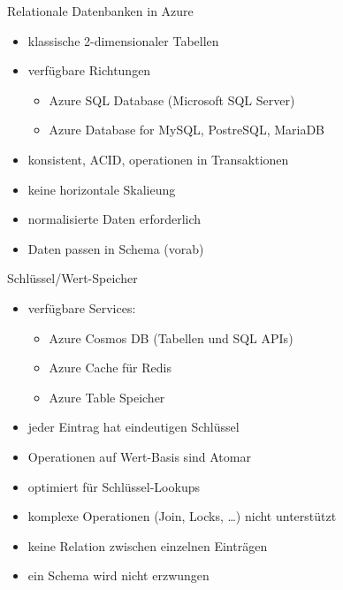 \begin{flashcard}[Definition]{Relationale Datenbanken in Azure}
  \begin{itemize}
    \item klassische 2-dimensionaler Tabellen
    \item verfügbare Richtungen
      \begin{itemize}
        \item Azure SQL Database (Microsoft SQL Server)
        \item Azure Database for MySQL, PostreSQL, MariaDB
      \end{itemize}
    \item konsistent, ACID, operationen in Transaktionen
    \item keine horizontale Skalieung
    \item normalisierte Daten erforderlich
    \item Daten passen in Schema (vorab)
  \end{itemize}
\end{flashcard}

\begin{flashcard}[Definition]{Schlüssel/Wert-Speicher}
  \begin{itemize}
    \item verfügbare Services:
      \begin{itemize}
        \item Azure Cosmos DB (Tabellen und SQL APIs)
        \item Azure Cache für Redis
        \item Azure Table Speicher
      \end{itemize}
    \item jeder Eintrag hat eindeutigen Schlüssel
    \item Operationen auf Wert-Basis sind Atomar
    \item optimiert für Schlüssel-Lookups
    \item komplexe Operationen (Join, Locks, \ldots) nicht unterstützt
    \item keine Relation zwischen einzelnen Einträgen
    \item ein Schema wird nicht erzwungen
  \end{itemize}
\end{flashcard}


